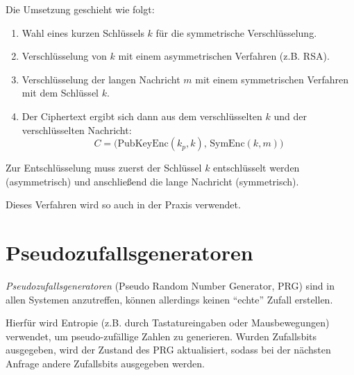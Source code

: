 \documentclass[a4paper, 11pt, accentcolor = tud3b]{tudreport}
\begin{document}
	        Die Umsetzung geschieht wie folgt:
	        \begin{enumerate}
	        	\item Wahl eines kurzen Schlüssels \(k\) für die symmetrische Verschlüsselung.
	        	\item Verschlüsselung von \(k\) mit einem asymmetrischen Verfahren (z.B. RSA).
	        	\item Verschlüsselung der langen Nachricht \(m\) mit einem symmetrischen Verfahren mit dem Schlüssel \(k\).
	        	\item Der Ciphertext ergibt sich dann aus dem verschlüsselten \(k\) und der verschlüsselten Nachricht:
		        	\begin{equation*}
			        	C = \big(\textrm{PubKeyEnc}(k_p, k),\, \textrm{SymEnc}(k, m)\big)
		        	\end{equation*}
	        \end{enumerate}
	        Zur Entschlüsselung muss zuerst der Schlüssel \(k\) entschlüsselt werden (asymmetrisch) und anschließend die lange Nachricht (symmetrisch).
	        
	        Dieses Verfahren wird so auch in der Praxis verwendet.

        \section{Pseudozufallsgeneratoren}
            \textit{Pseudozufallsgeneratoren} (Pseudo Random Number Generator, PRG) sind in allen Systemen anzutreffen, können allerdings keinen \enquote{echte} Zufall erstellen.
            
            Hierfür wird Entropie (z.B. durch Tastatureingaben oder Mausbewegungen) verwendet, um pseudo-zufällige Zahlen zu generieren. Wurden Zufallsbits ausgegeben, wird der Zustand des PRG aktualisiert, sodass bei der nächsten Anfrage andere Zufallsbits ausgegeben werden.
            
\end{document}
